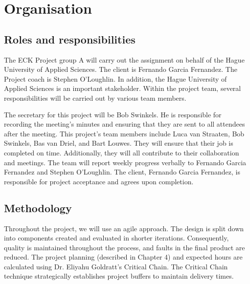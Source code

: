 \chapter{Organisation}
\label{ch:organisation}

\section{Roles and responsibilities}

The ECK Project group A will carry out the assignment on behalf of the Hague University of Applied Sciences. The client is Fernando Garcia Fernandez. The Project coach is Stephen O'Loughlin. In addition, the Hague University of Applied Sciences is an important stakeholder. 
\justify
Within the project team, several responsibilities will be carried out by various team members.

\justify
The secretary for this project will be Bob Swinkels. He is responsible for recording the meeting's minutes and ensuring that they are sent to all attendees after the meeting.
\justify
This project's team members include Luca van Straaten, Bob Swinkels, Bas van Driel, and Bart Louwes. They will ensure that their job is completed on time. Additionally, they will all contribute to their collaboration and meetings.
\justify
The team will report weekly progress verbally to Fernando Garcia Fernandez and Stephen O'Loughlin. 
The client, Fernando Garcia Fernandez, is responsible for project acceptance and agrees upon completion.

\section{Methodology}

Throughout the project, we will use an agile approach. The design is split down into components created and evaluated in shorter iterations. Consequently, quality is maintained throughout the process, and faults in the final product are reduced.
The project planning (described in Chapter 4) and expected hours are calculated using Dr. Eliyahu Goldratt's Critical Chain. The Critical Chain technique strategically establishes project buffers to maintain delivery times.

